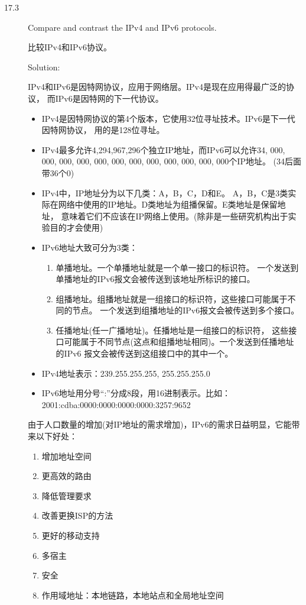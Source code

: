 \begin{description}
\item[17.3] Compare and contrast the IPv4 and IPv6 protocols.

  比较IPv4和IPv6协议。

  Solution:

  IPv4和IPv6是因特网协议，应用于网络层。IPv4是现在应用得最广泛的协议， 而IPv6是因特网的下一代协议。
  \begin{itemize}
  \item IPv4是因特网协议的第4个版本，它使用32位寻址技术。IPv6是下一代因特网协议， 用的是128位寻址。
  \item IPv4最多允许4,294,967,296个独立IP地址，而IPv6可以允许34, 000, 000, 000, 000, 000, 000, 000, 000, 000, 000, 000, 000个IP地址。 (34后面带36个0)
  \item IPv4中，IP地址分为以下几类：A，B，C，D和E。 A，B，C是3类实际在网络中使用的IP地址。D类地址为组播保留。E类地址是保留地址， 意味着它们不应该在IP网络上使用。(除非是一些研究机构出于实验目的才会使用)
  \item IPv6地址大致可分为3类：
    \begin{enumerate}
    \item 单播地址。一个单播地址就是一个单一接口的标识符。 一个发送到单播地址的IPv6报文会被传送到该地址所标识的接口。
    \item 组播地址。组播地址就是一组接口的标识符，这些接口可能属于不同的节点。 一个发送到组播地址的IPv6报文会被传送到多个接口。
    \item 任播地址(任一广播地址)。任播地址是一组接口的标识符， 这些接口可能属于不同节点(这点和组播地址相同)。一个发送到任播地址的IPv6 报文会被传送到这组接口中的其中一个。
    \end{enumerate}
  \item IPv4地址表示：239.255.255.255, 255.255.255.0
  \item IPv6地址用分号“:”分成8段，用16进制表示。比如： 2001:cdba:0000:0000:0000:0000:3257:9652
  \end{itemize} 
  由于人口数量的增加(对IP地址的需求增加)，IPv6的需求日益明显，它能带来以下好处：
  \begin{enumerate}
  \item  增加地址空间
  \item  更高效的路由
  \item  降低管理要求
  \item  改善更换ISP的方法
  \item  更好的移动支持
  \item  多宿主
  \item  安全
  \item  作用域地址：本地链路，本地站点和全局地址空间
  \end{enumerate}



\end{description}
